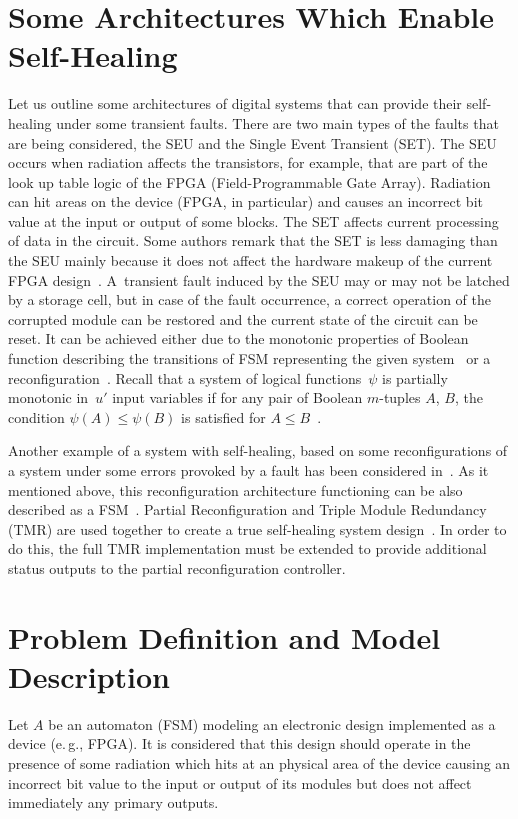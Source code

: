 \begin{multicols}{2}
\section{Some Architectures Which Enable Self-Healing}

\noindent
Let us outline some architectures of digital systems that can
provide their self-healing under some transient faults. There are
two main types of the faults that are being considered, the SEU
and the Single Event Transient (SET). The SEU occurs when radiation affects the transistors, for example,
that are part of the look up table logic of the FPGA (Field-Programmable Gate Array). Radiation
can hit areas on the device (FPGA, in particular) and causes an
incorrect bit value at the input or output of some blocks. The
SET affects current processing of data in the
circuit. Some authors remark that the SET is
less damaging than the SEU mainly because it does
not affect the hardware makeup of the current FPGA design~\cite{5fr}.
A~transient fault induced by the SEU may or may not be latched by a
storage cell, but in case of the fault occurrence, a correct
operation of the corrupted module can be restored and the current
state of the circuit can be reset. It can be achieved either due
to the monotonic properties of Boolean function describing the
transitions of FSM representing the given system~\cite{5fr} or a reconfiguration~\cite{2fr}.
Recall that a system of logical functions~$\psi$
is partially monotonic in~$u'$ input variables if for any pair of
Boolean $m$-tuples $A$, $B$, the condition $\psi(A)\le \psi(B)$ is
satisfied for $A\le B$~\cite{6fr}.

Another example of a system with self-healing, based on some
reconfigurations of a system under some errors provoked by a
fault has been considered in~\cite{5fr}. As it mentioned above, this
reconfiguration architecture functioning can be also described as
a FSM~\cite{10fr}. Partial Reconfiguration and Triple Module Redundancy (TMR)
are used together to create a true self-healing system design~\cite{5fr}.
In order to do this, the full TMR implementation must be extended
to provide additional status outputs to the partial
reconfiguration controller.

\section{Problem Definition and Model Description}

\noindent
Let $A$ be an automaton (FSM) modeling an electronic
design implemented as a device (e.\,g., FPGA).
It is considered that this design should operate in the
presence of some radiation which hits at an physical
area of the device causing an incorrect bit
value to the input or output of   its modules
but does not affect immediately any primary outputs.


\end{multicols}
